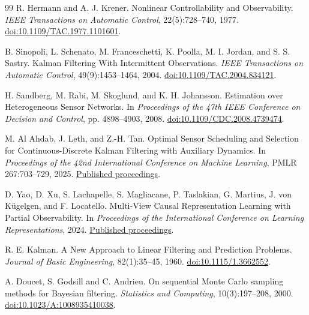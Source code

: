 \documentclass[11pt,a4paper]{article}
\begin{document}
\begin{thebibliography}{99}
R. Hermann and A. J. Krener.
Nonlinear Controllability and Observability.
\emph{IEEE Transactions on Automatic Control}, 22(5):728--740, 1977.
\href{https://doi.org/10.1109/TAC.1977.1101601}{doi:10.1109/TAC.1977.1101601}.

B. Sinopoli, L. Schenato, M. Franceschetti, K. Poolla, M. I. Jordan, and S. S. Sastry.
Kalman Filtering With Intermittent Observations.
\emph{IEEE Transactions on Automatic Control}, 49(9):1453--1464, 2004.
\href{https://doi.org/10.1109/TAC.2004.834121}{doi:10.1109/TAC.2004.834121}.

H. Sandberg, M. Rabi, M. Skoglund, and K. H. Johansson.
Estimation over Heterogeneous Sensor Networks.
In \emph{Proceedings of the 47th IEEE Conference on Decision and Control}, pp. 4898--4903, 2008.
\href{https://doi.org/10.1109/CDC.2008.4739474}{doi:10.1109/CDC.2008.4739474}.

M. Al Ahdab, J. Leth, and Z.-H. Tan.
Optimal Sensor Scheduling and Selection for Continuous-Discrete Kalman Filtering with Auxiliary Dynamics.
In \emph{Proceedings of the 42nd International Conference on Machine Learning}, PMLR 267:703--729, 2025.
\href{https://proceedings.mlr.press/v267/ahdab25a.html}{Published proceedings}.

D. Yao, D. Xu, S. Lachapelle, S. Magliacane, P. Taslakian, G. Martius, J. von K\"ugelgen, and F. Locatello.
Multi-View Causal Representation Learning with Partial Observability.
In \emph{Proceedings of the International Conference on Learning Representations}, 2024.
\href{https://proceedings.iclr.cc/paper_files/paper/2024/hash/956e5427549a82a7472e02adc88360e9-Abstract-Conference.html}{Published proceedings}.

R. E. Kalman.
A New Approach to Linear Filtering and Prediction Problems.
\emph{Journal of Basic Engineering}, 82(1):35--45, 1960.
\href{https://doi.org/10.1115/1.3662552}{doi:10.1115/1.3662552}.

A. Doucet, S. Godsill and C. Andrieu.
On sequential Monte Carlo sampling methods for Bayesian filtering.
\emph{Statistics and Computing}, 10(3):197--208, 2000.
\href{https://doi.org/10.1023/A:1008935410038}{doi:10.1023/A:1008935410038}.

\end{thebibliography}
\end{document}
